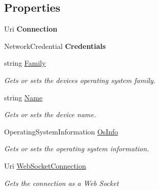 \subsection*{Properties}
\begin{DoxyCompactItemize}
\item 
Uri {\bfseries Connection}\hypertarget{class_test_app_1_1_default_device_portal_connection_a0fb5a3bdcff019a9430be38cb03b0349}{}\label{class_test_app_1_1_default_device_portal_connection_a0fb5a3bdcff019a9430be38cb03b0349}

\item 
Network\+Credential {\bfseries Credentials}\hypertarget{class_test_app_1_1_default_device_portal_connection_a201a61da970f3f6ed9055a540f1248d0}{}\label{class_test_app_1_1_default_device_portal_connection_a201a61da970f3f6ed9055a540f1248d0}

\item 
string \hyperlink{class_test_app_1_1_default_device_portal_connection_aba73087cacb18dc2ce8ffb0c042e5c7d}{Family}
\begin{DoxyCompactList}\small\item\em Gets or sets the device\textquotesingle{}s operating system family. \end{DoxyCompactList}\item 
string \hyperlink{class_test_app_1_1_default_device_portal_connection_a55187e1b0595431204ee607391b8d64d}{Name}
\begin{DoxyCompactList}\small\item\em Gets or sets the device name. \end{DoxyCompactList}\item 
Operating\+System\+Information \hyperlink{class_test_app_1_1_default_device_portal_connection_a9dd0ab39e0afc5f920f55ff2544679ca}{Os\+Info}
\begin{DoxyCompactList}\small\item\em Gets or sets the operating system information. \end{DoxyCompactList}\item 
Uri \hyperlink{class_test_app_1_1_default_device_portal_connection_a4a739c9b24f6ba5ac6021fadd40b77f9}{Web\+Socket\+Connection}
\begin{DoxyCompactList}\small\item\em Gets the connection as a Web Socket \end{DoxyCompactList}\end{DoxyCompactItemize}


